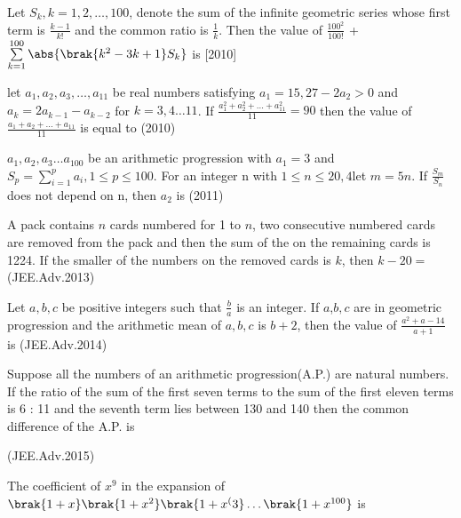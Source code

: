\iffalse
\title{Assignment -1}
\author{ee24btech10017-karthik}
\section{integer}
\fi

    

	\item Let $S_{k}, k = 1,2, \dots , 100$, denote the sum of the infinite geometric series whose first term is  $\frac{k - 1}{k!}$ and the common ratio is $\frac{1}{k}$. Then the value of $\frac{100^{2}}{100!}$ + $\sum\limits_{k=1}^{100} \abs{\brak{k^{2} - 3k +1}S_{k}} $ is \hfill[2010]

\item let $a_{1},a_{2},a_{3},\dots , a_{11}$ be real numbers satisfying $a_{1}= 15, 27 - 2a_{2} > 0$ and $a_{k}=2a_{k-1} - a_{k-2}$ for $k=3,4 \dots 11$. If $\frac{a_{1}^{2} + a_{2}^{2} + \dots +a_{11}^{2}}{11} = 90$ then the value of $\frac{a_{1} + a_{2} +\dots +a_{11}}{11}$ is equal to \hfill(2010)

\item $a_{1}, a_{2}, a_{3}\dots a_{100}$ be an arithmetic progression with $a_{1}= 3$ and $S_{p} =\sum\limits_{i=1}^{p} a_{i},1\leq p\leq 100$. For an integer n with $1 \leq n \leq 20,4$let $m= 5n$. If $\frac{S_{m}}{S_{n}}$ does not depend on n, then $a_{2}$ is \hfill(2011)

   \item A pack contains $n$ cards numbered for 1 to $n$, two consecutive numbered cards are removed from the pack and then the sum of the on the remaining cards is 1224. If the smaller of the numbers on the removed cards is $k$, then $k - 20=$ \hfill(JEE.Adv.2013)

   \item Let $a,b,c$ be positive integers such that $\frac{b}{a}$ is an integer. If $a$,$b,c$ are in geometric progression and the arithmetic mean of $a,b,c$ is $b + 2$, then the value of $\frac{a^{2} + a - 14}{a + 1}$ is \hfill(JEE.Adv.2014)

   \item Suppose all the numbers of an arithmetic progression(A.P.) are natural numbers. If the ratio of the sum of the first seven terms to the sum of the first eleven terms is 6 : 11 and the seventh term lies between 130 and 140 then the common difference of the A.P. is 
   
    \hfill(JEE.Adv.2015)

   \item The coefficient of $x^{9}$ in the expansion of $\brak{1+x}\brak{1+x^{2}}\brak{1+x^({3}} \dots \brak{1+x^{100}} $ is 
   
